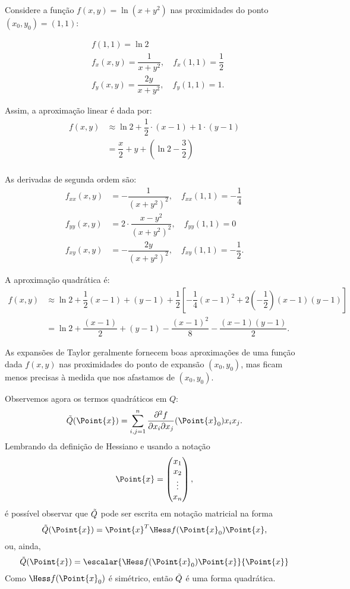 \begin{example}{}{}
Considere a função \(f(x, y) = \ln \left(x+y^2\right)\) nas proximidades do ponto \((x_0, y_0) = (1,1)\):

\[
\begin{aligned}
& f(1,1) = \ln 2 \\
& f_x(x, y) = \dfrac{1}{x+y^2}, \quad f_x(1,1) = \dfrac{1}{2} \\
& f_y(x, y) = \dfrac{2 y}{x+y^2}, \quad f_y(1,1) = 1 .
\end{aligned}
\]

Assim, a aproximação linear é dada por:
\[
\begin{aligned}
f(x, y) & \approx \ln 2 + \dfrac{1}{2}\cdot(x-1) + 1 \cdot (y-1) \\
& = \dfrac{x}{2} + y + \left(\ln 2 - \dfrac{3}{2}\right) \\
\end{aligned}
\]

As derivadas de segunda ordem são:
\[
\begin{aligned}
f_{xx}(x, y) & = -\dfrac{1}{\left(x+y^2\right)^2}, \quad f_{xx}(1,1) = -\dfrac{1}{4} \\
f_{yy}(x, y) & = 2 \cdot \dfrac{x-y^2}{\left(x+y^2\right)^2}, \quad f_{yy}(1,1) = 0 \\
f_{xy}(x, y) & = -\dfrac{2 y}{\left(x+y^2\right)^2}, \quad f_{xy}(1,1) = -\dfrac{1}{2} .
\end{aligned}
\]

A aproximação quadrática é:
\[
\begin{aligned}
f(x, y) & \approx \ln 2 + \dfrac{1}{2}(x-1) + (y-1) + \dfrac{1}{2}\left[-\dfrac{1}{4}(x-1)^2 + 2  \left(-\dfrac{1}{2}\right) (x-1)(y-1)  \right] \\[.5em]
& = \ln 2 + \dfrac{(x-1)}{2} + (y-1) - \dfrac{(x-1)^2}{8} - \dfrac{(x-1)(y-1)}{2} .
\end{aligned}
\]


\end{example}

As expansões de Taylor geralmente fornecem boas aproximações de uma função dada \(f(x, y)\) nas proximidades do ponto de expansão \((x_0, y_0)\), mas ficam menos precisas à medida que nos afastamos de \((x_0, y_0)\).    


Observemos agora os termos quadráticos em $Q$:
$$\Tilde{Q}(\Point{x})=\sum_{i,j=1}^n \dfrac{\partial ^2 f}{\partial x_i \partial x_j}(\Point{x}_0)x_ix_j.$$
Lembrando da definição de Hessiano e usando a notação
$$\Point{x}=\begin{pmatrix}
    x_1\\ x_2\\ \vdots \\ x_n
\end{pmatrix},$$
é possível observar que $\Tilde{Q}$ pode ser escrita em notação matricial na forma 
$$\Tilde{Q}(\Point{x})=\Point{x}^T \Hess f(\Point{x}_0) \Point{x},$$
ou, ainda,
$$\Tilde{Q}(\Point{x})=\escalar{\Hess f(\Point{x}_0) \Point{x}}{\Point{x}}$$
Como $\Hess f(\Point{x}_0)$ é simétrico, então $\Tilde{Q}$ é uma forma quadrática. 

